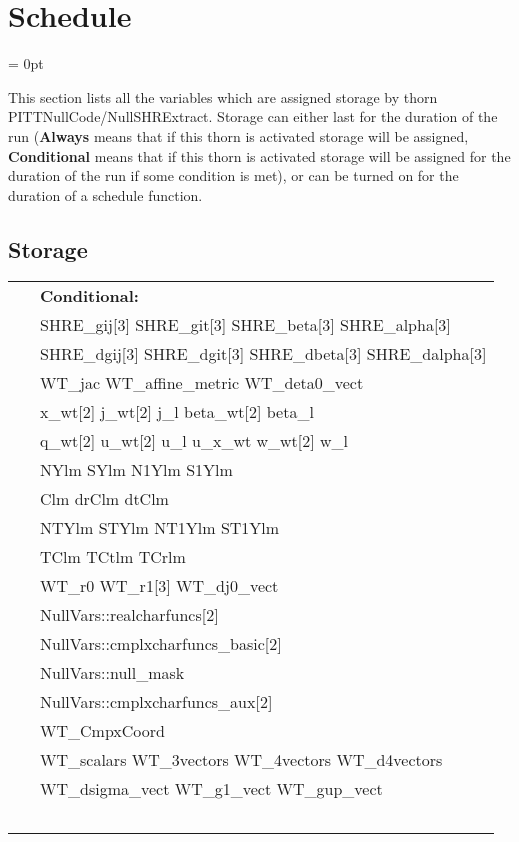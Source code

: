 
\section{Schedule} 


\parskip = 0pt


\noindent This section lists all the variables which are assigned storage by thorn PITTNullCode/NullSHRExtract.  Storage can either last for the duration of the run ({\bf Always} means that if this thorn is activated storage will be assigned, {\bf Conditional} means that if this thorn is activated storage will be assigned for the duration of the run if some condition is met), or can be turned on for the duration of a schedule function.


\subsection*{Storage}

\hspace{5mm}

 \begin{tabular*}{160mm}{ll} 
~& {\bf Conditional:} \\ 
~ &  SHRE\_gij[3] SHRE\_git[3] SHRE\_beta[3] SHRE\_alpha[3]\\ 
~ &  SHRE\_dgij[3] SHRE\_dgit[3] SHRE\_dbeta[3] SHRE\_dalpha[3]\\ 
~ &  WT\_jac WT\_affine\_metric WT\_deta0\_vect\\ 
~ &  x\_wt[2] j\_wt[2] j\_l beta\_wt[2] beta\_l\\ 
~ &  q\_wt[2] u\_wt[2] u\_l u\_x\_wt w\_wt[2] w\_l\\ 
~ &  NYlm SYlm N1Ylm S1Ylm\\ 
~ &  Clm drClm dtClm\\ 
~ &  NTYlm STYlm NT1Ylm ST1Ylm\\ 
~ &  TClm TCtlm TCrlm\\ 
~ &  WT\_r0 WT\_r1[3] WT\_dj0\_vect\\ 
~ &  NullVars::realcharfuncs[2]\\ 
~ &  NullVars::cmplxcharfuncs\_basic[2]\\ 
~ &  NullVars::null\_mask\\ 
~ &  NullVars::cmplxcharfuncs\_aux[2]\\ 
~ &  WT\_CmpxCoord\\ 
~ &  WT\_scalars WT\_3vectors WT\_4vectors WT\_d4vectors\\ 
~ &  WT\_dsigma\_vect WT\_g1\_vect WT\_gup\_vect\\ 
~ & ~\\ 
\end{tabular*} 


